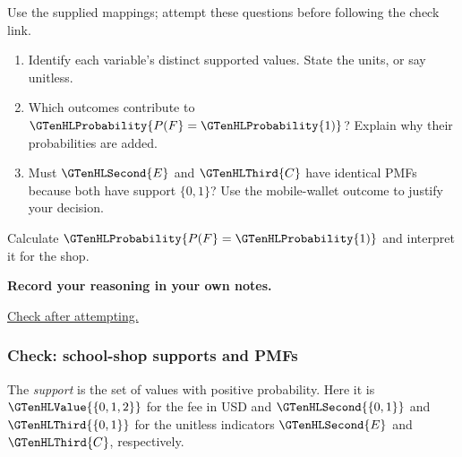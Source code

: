\noindent{} Use the supplied mappings; attempt these questions before following the check link.
\begin{enumerate}
\item Identify each variable's distinct supported values. State the units, or say unitless.
\item Which outcomes contribute to $\GTenHLProbability{P(F}=\GTenHLProbability{1)}$? Explain why their probabilities are added.
\item Must $\GTenHLSecond{E}$ and $\GTenHLThird{C}$ have identical PMFs because both have support $\{0,1\}$? Use the mobile-wallet outcome to justify your decision.
\end{enumerate}
\noindent{} Calculate $\GTenHLProbability{P(F}=\GTenHLProbability{1)}$ and interpret it for the shop.
\par\medskip\noindent\textbf{Record your reasoning in your own notes.}\par

\par\smallskip\noindent\hyperref[check:school-shop]{Check after attempting.}
\subsubsection*{Check: school-shop supports and PMFs}\label{check:school-shop}

The \emph{support} is the set of values with positive probability. Here it is $\GTenHLValue{\{0,1,2\}}$ for the fee in USD and $\GTenHLSecond{\{0,1\}}$ and $\GTenHLThird{\{0,1\}}$ for the unitless indicators $\GTenHLSecond{E}$ and $\GTenHLThird{C}$, respectively.

